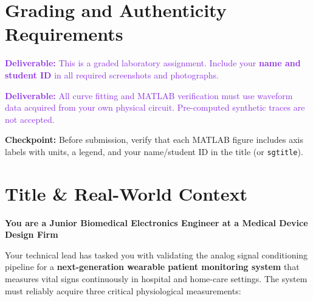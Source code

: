 \documentclass[11pt,letterpaper]{article}
\providecommand{\cpECE}[1]{\textcolor{OliveGreen}{\textbf{Checkpoint:} #1}}
\providecommand{\delECE}[1]{\textcolor{BlueViolet}{\textbf{Deliverable:} #1}}
\begin{document}
\clearpage

\section*{Grading and Authenticity Requirements}
\delECE{This is a graded laboratory assignment. Include your \textbf{name and student ID} in all required screenshots and photographs.}

\delECE{All curve fitting and MATLAB verification must use waveform data acquired from your own physical circuit. Pre-computed synthetic traces are not accepted.}

\cpECE{Before submission, verify that each MATLAB figure includes axis labels with units, a legend, and your name/student ID in the title (or \texttt{sgtitle}).}

\clearpage

\section*{Title \& Real-World Context}

\noindent
\textbf{\large You are a Junior Biomedical Electronics Engineer at a Medical Device Design Firm}

\noindent
Your technical lead has tasked you with validating the analog signal conditioning pipeline for a \textbf{next-generation wearable patient monitoring system} that measures vital signs continuously in hospital and home-care settings. The system must reliably acquire three critical physiological measurements:
\end{document}
